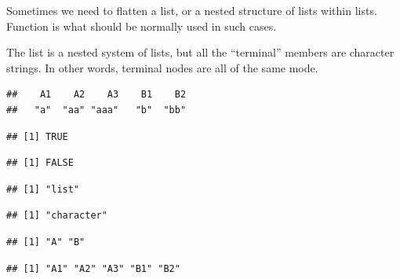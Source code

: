 \documentclass[krantz2]{krantz}\usepackage{knitr}%
\begin{document}
Sometimes we need to flatten a list, or a nested structure of lists within lists. Function  is what should be normally used in such cases.

The list  is a nested system of lists, but all the ``terminal'' members are character strings. In other words, terminal nodes are all of the same mode.

\begin{knitrout}\footnotesize
{}\color{fgcolor}\begin{kframe}
\begin{alltt}
 \hlkwb{<-} 
\end{alltt}
\begin{verbatim}
##    A1    A2    A3    B1    B2 
##   "a"  "aa" "aaa"   "b"  "bb"
\end{verbatim}
\begin{alltt}
\end{alltt}
\begin{verbatim}
## [1] TRUE
\end{verbatim}
\begin{alltt}
\end{alltt}
\begin{verbatim}
## [1] FALSE
\end{verbatim}
\begin{alltt}
\end{alltt}
\begin{verbatim}
## [1] "list"
\end{verbatim}
\begin{alltt}
\end{alltt}
\begin{verbatim}
## [1] "character"
\end{verbatim}
\begin{alltt}
\end{alltt}
\begin{verbatim}
## [1] "A" "B"
\end{verbatim}
\begin{alltt}
\end{alltt}
\begin{verbatim}
## [1] "A1" "A2" "A3" "B1" "B2"
\end{verbatim}
\end{kframe}
\end{knitrout}
\end{document}
